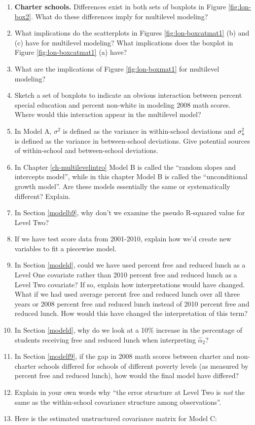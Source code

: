 \documentclass[
]{krantz}
\begin{document}
\begin{enumerate}
\def\labelenumi{\arabic{enumi}.}
\setcounter{enumi}{5}
\item
  \textbf{Charter schools.} Differences exist in both sets of boxplots in Figure \ref{fig:lon-box2}. What do these differences imply for multilevel modeling?
\item
  What implications do the scatterplots in Figures \ref{fig:lon-boxcatmat1} (b) and (c) have for multilevel modeling? What implications does the boxplot in Figure \ref{fig:lon-boxcatmat1} (a) have?
\item
  What are the implications of Figure \ref{fig:lon-boxmat1} for multilevel modeling?
\item
  Sketch a set of boxplots to indicate an obvious interaction between percent special education and percent non-white in modeling 2008 math scores. Where would this interaction appear in the multilevel model?
\item
  In Model A, \(\sigma^2\) is defined as the variance in within-school deviations and \(\sigma^2_u\) is defined as the variance in between-school deviations. Give potential sources of within-school and between-school deviations.
\item
  In Chapter \ref{ch-multilevelintro} Model B is called the ``random slopes and intercepts model'', while in this chapter Model B is called the ``unconditional growth model''. Are these models essentially the same or systematically different? Explain.
\item
  In Section \ref{modelb9}, why don't we examine the pseudo R-squared value for Level Two?
\item
  If we have test score data from 2001-2010, explain how we'd create new variables to fit a piecewise model.
\item
  In Section \ref{modeld}, could we have used percent free and reduced lunch as a Level One covariate rather than 2010 percent free and reduced lunch as a Level Two covariate? If so, explain how interpretations would have changed. What if we had used average percent free and reduced lunch over all three years or 2008 percent free and reduced lunch instead of 2010 percent free and reduced lunch. How would this have changed the interpretation of this term?
\item
  In Section \ref{modeld}, why do we look at a 10\% increase in the percentage of students receiving free and reduced lunch when interpreting \(\hat{\alpha}_{2}\)?
\item
  In Section \ref{modelf9}, if the gap in 2008 math scores between charter and non-charter schools differed for schools of different poverty levels (as measured by percent free and reduced lunch), how would the final model have differed?
\item
  Explain in your own words why ``the error structure at Level Two is \emph{not} the same as the within-school covariance structure among observations''.
\item
  Here is the estimated unstructured covariance matrix for Model C:


\end{enumerate}
\end{document}
